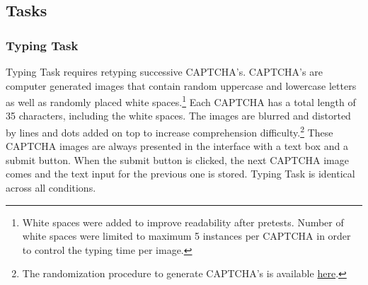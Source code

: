 \documentclass[11pt,a4paper,oneside]{article}
\begin{document}


\subsection{Tasks}
\subsubsection{Typing Task} \label{typing-task}

Typing Task requires retyping successive CAPTCHA's. CAPTCHA's are computer generated images that contain random uppercase and lowercase letters as well as randomly placed white spaces.\footnote{White spaces were added to improve readability after pretests. Number of white spaces were  limited to maximum 5 instances per CAPTCHA in order to control the typing time per image.}  Each CAPTCHA has a total length of 35 characters, including the white spaces. The images are blurred and distorted by lines and dots added on top to increase comprehension difficulty.\footnote{The randomization procedure to generate CAPTCHA's is available \href{https://osf.io/2vqwf/?view_only=1ef589ec2e544db4ad9b6ab9c45ff849}{here}.} These CAPTCHA images are always presented in the interface with a text box and a submit button. When the submit button is clicked, the next CAPTCHA image comes and the text input for the previous one is stored. Typing Task is identical across all conditions.
\end{document}
